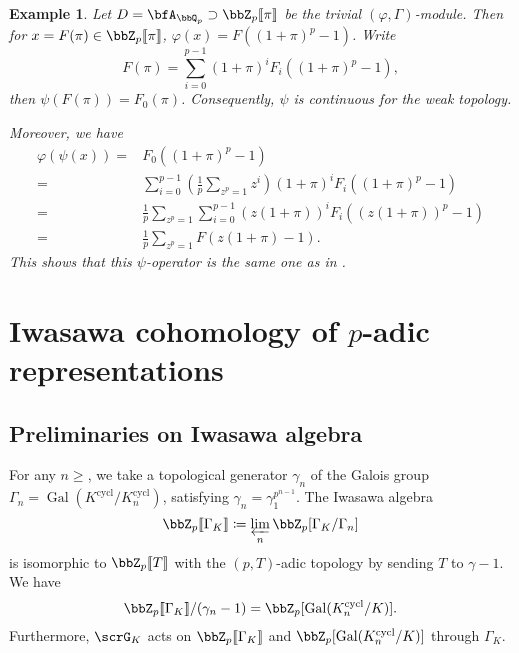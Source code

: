 \documentclass[a4paper,oneside]{amsart}
\DeclareMathOperator{\Gal}{Gal}
\DeclareMathOperator{\cycl}{cycl}
\newtheorem{example}[theorem]{Example}
\numberwithin{equation}{section}
\begin{document}
\begin{example}\label{eg:57892}
    Let $D=\bfA_{\bbQ_p}\supset \bbZ_p\llbracket \pi\rrbracket$ be the trivial $(\varphi,\Gamma)$-module. Then for $x=F(\pi)\in\bbZ_p\llbracket\pi\rrbracket$, $\varphi(x)=F((1+\pi)^p-1)$. Write
    $$F(\pi)=\sum_{i=0}^{p-1}(1+\pi)^i F_i((1+\pi)^p-1),$$
    then $\psi(F(\pi))=F_0(\pi)$. Consequently, $\psi$ is continuous for the weak topology.

    Moreover, we have
    \begin{equation}
        \begin{aligned}
            \varphi(\psi(x))= & F_0((1+\pi)^p-1)                                                                  \\
            =                 & \sum_{i=0}^{p-1}\left(\frac{1}{p}\sum_{z^p=1}z^i\right)(1+\pi)^i F_i((1+\pi)^p-1) \\
            =                 & \frac{1}{p}\sum_{z^p=1}\sum_{i=0}^{p-1}(z(1+\pi))^i F_i((z(1+\pi))^p-1)           \\
            =                 & \frac{1}{p}\sum_{z^p=1}F(z(1+\pi)-1).
        \end{aligned}
    \end{equation}
    This shows that this $\psi$-operator is the same one as in \cite[Proposition 2.2.3]{coates_cyclotomic_2006}.
\end{example}


\section{Iwasawa cohomology of $p$-adic representations}
\subsection{Preliminaries on Iwasawa algebra}
For any $n\geq $, we take a topological generator $\gamma_n$ of the Galois group $\Gamma_n=\Gal(K^{\cycl}/K_n^{\cycl})$, satisfying $\gamma_n=\gamma_1^{p^{n-1}}$. The Iwasawa algebra
$$\bbZ_p\llbracket\Gamma_K\rrbracket\coloneqq \varprojlim_n \bbZ_p[\Gamma_K/\Gamma_n]$$
is isomorphic to $\bbZ_p\llbracket T\rrbracket$ with the $(p,T)$-adic topology by sending $T$ to $\gamma-1$. We have
$$\bbZ_p\llbracket \Gamma_K\rrbracket/(\gamma_n-1)=\bbZ_p[\Gal(K_n^{\cycl}/K)].$$
Furthermore, $\scrG_K$ acts on $\bbZ_p\llbracket\Gamma_K\rrbracket$ and $\bbZ_p[\Gal(K_n^{\cycl}/K)]$ through $\Gamma_K$.
\end{document}
